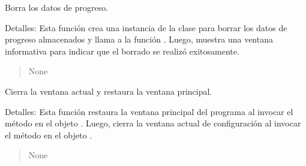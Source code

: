 \documentclass[letterpaper,10pt,spanish]{sphinxmanual}
\begin{document}
\begin{fulllineitems}

\begin{fulllineitems}
\label{\detokenize{configuracion:configuracion.Configuracion.borrar_progreso}}
\pysigstartsignatures
{}
\pysigstopsignatures
\sphinxAtStartPar
Borra los datos de progreso.

\sphinxAtStartPar
Detalles: Esta función crea una instancia de la clase  para borrar los datos de progreso
almacenados y llama a la función . Luego, muestra una ventana informativa para indicar que el
borrado se realizó exitosamente.
\begin{quote}\begin{description}
\sphinxAtStartPar
None

\end{description}\end{quote}

\end{fulllineitems}


\begin{fulllineitems}
\label{\detokenize{configuracion:configuracion.Configuracion.cerrar_ventana}}
\pysigstartsignatures
{}
\pysigstopsignatures
\sphinxAtStartPar
Cierra la ventana actual y restaura la ventana principal.

\sphinxAtStartPar
Detalles:
Esta función restaura la ventana principal del programa al invocar el método
 en el objeto . Luego, cierra la ventana actual
de configuración al invocar el método  en el objeto .
\begin{quote}\begin{description}
\sphinxAtStartPar
None

\end{description}\end{quote}


\end{fulllineitems}
\end{fulllineitems}
\end{document}
